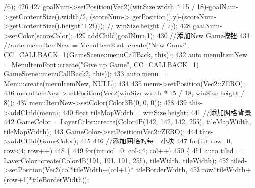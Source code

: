 \begin{DoxyCode}
{      /6);
426     
427     goalNum->setPosition(Vec2((winSize.width * 15 / 18)-goalNum->getContentSize().width/2, (scoreNum->
      getPosition().y)-(scoreNum->getContentSize().height*1.2f))); \textcolor{comment}{// winSize.height / 2));}
428     goalNum->setColor(scoreColor);
429     addChild(goalNum,1);
430     \textcolor{comment}{//添加New Game按钮}
431     \textcolor{comment}{//auto menuItemNew = MenuItemFont::create("New Game", CC\_CALLBACK\_1(GameScene::menuCallBack, this));}
432     \textcolor{keyword}{auto} menuItemNew = MenuItemFont::create(\textcolor{stringliteral}{"Give up Game"}, CC\_CALLBACK\_1(
      \hyperlink{class_code_lady_j_j_y_1_1game2048_1_1_game_scene_a5fb8ef01d49e87cd898f4d9646dd3034}{GameScene::menuCallBack2}, \textcolor{keyword}{this}));
433     \textcolor{keyword}{auto} menu = Menu::create(menuItemNew, NULL);
434 
435     menu->setPosition(Vec2::ZERO);
436     menuItemNew->setPosition(Vec2(winSize.width * 15 / 18, winSize.height / 8));
437     menuItemNew->setColor(Color3B(0, 0, 0));
438 
439     this->addChild(menu);
440     \textcolor{keywordtype}{float} tileMapWidth = winSize.height;
441     \textcolor{comment}{//添加网格背景}
442     \hyperlink{class_code_lady_j_j_y_1_1game2048_1_1_game_scene_a191affcd48b814ad840883e491107a2b}{GameColor} = LayerColor::create(Color4B(142, 142, 142, 255), tileMapWidth, tileMapWidth);
443     \hyperlink{class_code_lady_j_j_y_1_1game2048_1_1_game_scene_a191affcd48b814ad840883e491107a2b}{GameColor}->setPosition(Vec2::ZERO);
444     this->addChild(\hyperlink{class_code_lady_j_j_y_1_1game2048_1_1_game_scene_a191affcd48b814ad840883e491107a2b}{GameColor});
445 
446     \textcolor{comment}{//添加网格的每一小块}
447     \textcolor{keywordflow}{for}(\textcolor{keywordtype}{int} row=0; row<4; row++)
448     \{
449         \textcolor{keywordflow}{for}(\textcolor{keywordtype}{int} col=0; col<4; col++)
450         \{
451             \textcolor{keyword}{auto} tiled = LayerColor::create(Color4B(191, 191, 191, 255), 
      \hyperlink{class_code_lady_j_j_y_1_1game2048_1_1_game_scene_ab307f78ad0015cd32b2c71483fcb3cc5}{tileWidth}, \hyperlink{class_code_lady_j_j_y_1_1game2048_1_1_game_scene_ab307f78ad0015cd32b2c71483fcb3cc5}{tileWidth});
452             tiled->setPosition(Vec2(col*\hyperlink{class_code_lady_j_j_y_1_1game2048_1_1_game_scene_ab307f78ad0015cd32b2c71483fcb3cc5}{tileWidth}+(col+1)*
      \hyperlink{class_code_lady_j_j_y_1_1game2048_1_1_game_scene_a6f0cd9c0147ba3acc5290d443db8d7d8}{tileBorderWidth}, 
453                 row*\hyperlink{class_code_lady_j_j_y_1_1game2048_1_1_game_scene_ab307f78ad0015cd32b2c71483fcb3cc5}{tileWidth}+(row+1)*\hyperlink{class_code_lady_j_j_y_1_1game2048_1_1_game_scene_a6f0cd9c0147ba3acc5290d443db8d7d8}{tileBorderWidth}));
}
\end{DoxyCode}
